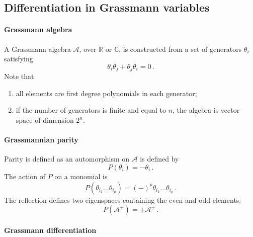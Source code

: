 \begin{subappendices}
  
\section{Differentiation in Grassmann variables}
\label{sec:diff-grassm-vari}

\paragraph{Grassmann algebra}

A Grassmann algebra $\mathcal{A}$, over $\mathbb{R}$ or $\mathbb{C}$,
is constructed from a set of generators $\theta_i$ satisfying
\begin{equation}
  \label{eq:AntiCommGen}
  \theta_i \theta_j + \theta_j \theta_i = 0\, .
\end{equation}
Note that 
\begin{enumerate}
\item all elements are first degree polynomials in each generator; 
\item if the number of generators is finite and equal to $n$, the
  algebra is vector space of dimension $2^n$.
\end{enumerate}

\paragraph{Grassmannian parity}

Parity is defined as an automorphism on $\mathcal{A}$ is defined by
\begin{equation}
  \label{eq:GrassParity}
  P(\theta_i) = - \theta_i\, .
\end{equation}
The action of $P$ on a monomial is
\begin{equation}
  \label{eq:GrassParMon}
  P(\theta_{i_1} \ldots \theta_{i_p}) = (-)^p \theta_{i_1} \ldots
  \theta_{i_p}\, .
\end{equation}
The reflection defines two eigenspaces containing the even and odd
elements:
\begin{equation}
  \label{eq:ParitySubspaces}
  P(\mathcal{A}^\pm) = \pm \mathcal{A}^\pm\, .
\end{equation}

\paragraph{Grassmann differentiation}


\end{subappendices}
